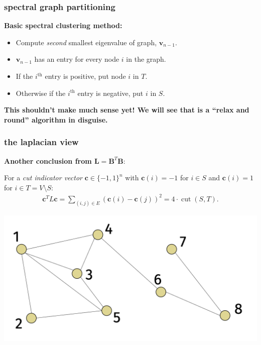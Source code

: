 \documentclass[compress]{beamer}
\newcommand{\bv}[1]{\mathbf{#1}}
\DeclareMathOperator{\cut}{cut}
\begin{document}
\begin{frame}
		\frametitle{spectral graph partitioning}
	\textbf{Basic spectral clustering method:}
	\begin{itemize}
		\item Compute \emph{second} smallest eigenvalue of graph, $\bv{v}_{n-1}$.
		\item $\bv{v}_{n-1}$ has an entry for every node $i$ in the graph.
		\item If the $i^{\text{th}}$ entry is positive, put node $i$ in $T$.
		\item Otherwise if the $i^{\text{th}}$ entry is negative, put $i$ in $S$.
	\end{itemize}	
\begin{center}
	\textbf{\alert{This shouldn't make much sense yet!} We will see that is a ``relax and round'' algorithm in disguise.}
\end{center}
\end{frame}


\begin{frame}[t]
	\frametitle{the laplacian view}
	\textbf{Another conclusion from $\bv{L} = \bv{B}^T\bv{B}$}:
	
	
	For a \emph{cut indicator vector} $\bv{c} \in \{-1,1\}^n$ with $\bv{c}(i) = -1$ for $i \in S$ and $\bv{c}(i) = 1$ for $i \in T = V \setminus S$:
		\begin{align}
			 \bv{c}^T L \bv{c} = \sum_{(i,j)  \in E} (\bv{c}(i)- \bv{c}(j))^2 = 4 \cdot \cut(S,T).
		\end{align}
	
	\begin{center}
		\includegraphics[width=.8\textwidth]{undirected_graph.png}
	\end{center}
\end{frame}
\end{document}
